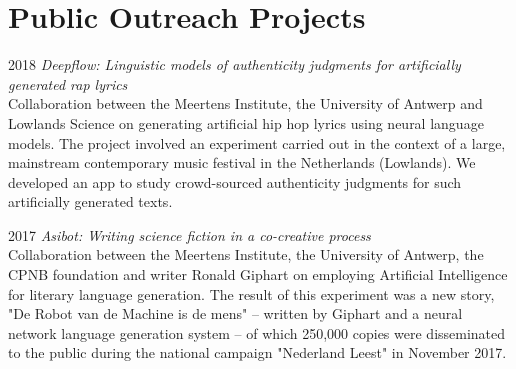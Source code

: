 \documentclass[12pt,letterpaper]{report}
\begin{document}
\section*{Public Outreach Projects}
\begin{tablist}
\item[2018] \tab{}\textit{Deepflow: Linguistic models of authenticity judgments for
    artificially generated rap lyrics}\\
  Collaboration between the Meertens Institute, the University of Antwerp and Lowlands
  Science on generating artificial hip hop lyrics using neural language models. The
  project involved an experiment carried out in the context of a large, mainstream
  contemporary music festival in the Netherlands (Lowlands). We developed an app to study
  crowd-sourced authenticity judgments for such artificially generated texts.
\item[2017] \tab{}\textit{Asibot: Writing science fiction in a co-creative process}\\
  Collaboration between the Meertens Institute, the University of Antwerp, the CPNB
  foundation and writer Ronald Giphart on employing Artificial Intelligence for literary
  language generation. The result of this experiment was a new story, "De Robot van de
  Machine is de mens" – written by Giphart and a neural network language generation system
  – of which 250,000 copies were disseminated to the public during the national campaign
  "Nederland Leest" in November 2017.
\end{tablist}
\end{document}
